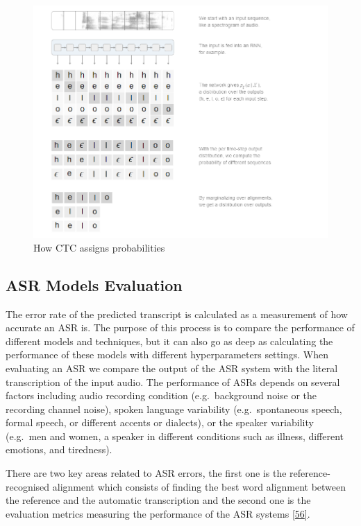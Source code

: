 \documentclass[
  a4paper,
]{article}
\begin{document}
\begin{figure}

{\centering \includegraphics{prob} 

}

\caption{How CTC assigns probabilities}\label{fig:prob}
\end{figure}

\hypertarget{asr-models-evaluation}{%
\subsection{ASR Models Evaluation}\label{asr-models-evaluation}}

The error rate of the predicted transcript is calculated as a
measurement of how accurate an ASR is. The purpose of this process is to
compare the performance of different models and techniques, but it can
also go as deep as calculating the performance of these models with
different hyperparameters settings. When evaluating an ASR we compare
the output of the ASR system with the literal transcription of the input
audio. The performance of ASRs depends on several factors including
audio recording condition (e.g.~background noise or the recording
channel noise), spoken language variability (e.g.~spontaneous speech,
formal speech, or different accents or dialects), or the speaker
variability (e.g.~men and women, a speaker in different conditions such
as illness, different emotions, and tiredness).

There are two key areas related to ASR errors, the first one is the
reference-recognised alignment which consists of finding the best word
alignment between the reference and the automatic transcription and the
second one is the evaluation metrics measuring the performance of the
ASR systems \protect\hyperlink{ref-ERRATTAHI201832}{{[}56{]}}.
\end{document}
